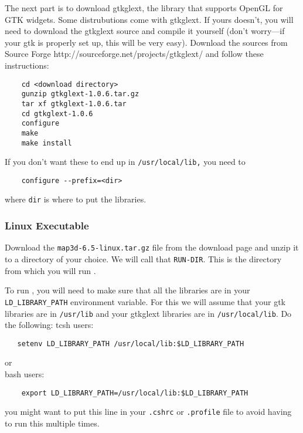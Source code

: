 
The next part is to download gtkglext, the library that supports OpenGL for
GTK widgets.  Some distrubutions come with gtkglext.
If yours doesn't, you will need to download the gtkglext source and
compile it yourself (don't worry---if your gtk is properly set up, this
will be very easy).  Download the sources from Source Forge
{http://sourceforge.net/projects/gtkglext/} and follow these instructions:
%
\begin{verbatim}
    cd <download directory>
    gunzip gtkglext-1.0.6.tar.gz
    tar xf gtkglext-1.0.6.tar
    cd gtkglext-1.0.6
    configure
    make
    make install
\end{verbatim}

If you don't want these to end up in \texttt{/usr/local/lib,} you need to
%
\begin{verbatim}
    configure --prefix=<dir>
\end{verbatim}
%
where \texttt{dir} is where to put the libraries. 

\subsubsection{Linux Executable}

Download the \texttt{map3d-6.5-linux.tar.gz} file from the \map{} download page
and unzip it to a directory of your choice.  We will call that
\texttt{RUN-DIR}. This is the directory from which you will run \map{}.

To run \map{}, you will need to make sure that all the libraries are in
your \verb|LD_LIBRARY_PATH| environment variable.  For this we will assume
that your gtk libraries are in \texttt{/usr/lib} and your gtkglext
libraries are in \texttt{/usr/local/lib}.  Do the following:
%
tcsh users:
\begin{verbatim}
   setenv LD_LIBRARY_PATH /usr/local/lib:$LD_LIBRARY_PATH
\end{verbatim}
or\\
%
bash users:
\begin{verbatim} 
    export LD_LIBRARY_PATH=/usr/local/lib:$LD_LIBRARY_PATH
\end{verbatim}

you might want to put this line in your \texttt{.cshrc} or
\texttt{.profile} file to avoid having to run this multiple times.

